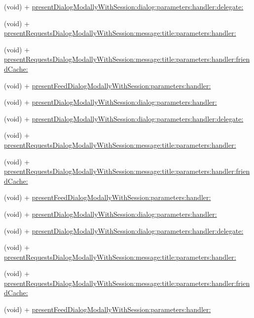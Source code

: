 \begin{DoxyCompactItemize}
(void) + \hyperlink{interfaceFBWebDialogs_a8be8194bef8e87199f915373776e122f}{present\+Dialog\+Modally\+With\+Session\+:dialog\+:parameters\+:handler\+:delegate\+:}
\item 
(void) + \hyperlink{interfaceFBWebDialogs_abea4b28e51126b41381c83cac5aa6a1c}{present\+Requests\+Dialog\+Modally\+With\+Session\+:message\+:title\+:parameters\+:handler\+:}
\item 
(void) + \hyperlink{interfaceFBWebDialogs_a50539709ca0985ee356cfa23b2eb2903}{present\+Requests\+Dialog\+Modally\+With\+Session\+:message\+:title\+:parameters\+:handler\+:friend\+Cache\+:}
\item 
(void) + \hyperlink{interfaceFBWebDialogs_a040eaa8259068aa3035ee5aa803a1271}{present\+Feed\+Dialog\+Modally\+With\+Session\+:parameters\+:handler\+:}
\item 
(void) + \hyperlink{interfaceFBWebDialogs_aa4d2e1b0b7a49ea3d08964a09a20ec63}{present\+Dialog\+Modally\+With\+Session\+:dialog\+:parameters\+:handler\+:}
\item 
(void) + \hyperlink{interfaceFBWebDialogs_a8be8194bef8e87199f915373776e122f}{present\+Dialog\+Modally\+With\+Session\+:dialog\+:parameters\+:handler\+:delegate\+:}
\item 
(void) + \hyperlink{interfaceFBWebDialogs_abea4b28e51126b41381c83cac5aa6a1c}{present\+Requests\+Dialog\+Modally\+With\+Session\+:message\+:title\+:parameters\+:handler\+:}
\item 
(void) + \hyperlink{interfaceFBWebDialogs_a50539709ca0985ee356cfa23b2eb2903}{present\+Requests\+Dialog\+Modally\+With\+Session\+:message\+:title\+:parameters\+:handler\+:friend\+Cache\+:}
\item 
(void) + \hyperlink{interfaceFBWebDialogs_a040eaa8259068aa3035ee5aa803a1271}{present\+Feed\+Dialog\+Modally\+With\+Session\+:parameters\+:handler\+:}
\item 
(void) + \hyperlink{interfaceFBWebDialogs_aa4d2e1b0b7a49ea3d08964a09a20ec63}{present\+Dialog\+Modally\+With\+Session\+:dialog\+:parameters\+:handler\+:}
\item 
(void) + \hyperlink{interfaceFBWebDialogs_a8be8194bef8e87199f915373776e122f}{present\+Dialog\+Modally\+With\+Session\+:dialog\+:parameters\+:handler\+:delegate\+:}
\item 
(void) + \hyperlink{interfaceFBWebDialogs_abea4b28e51126b41381c83cac5aa6a1c}{present\+Requests\+Dialog\+Modally\+With\+Session\+:message\+:title\+:parameters\+:handler\+:}
\item 
(void) + \hyperlink{interfaceFBWebDialogs_a50539709ca0985ee356cfa23b2eb2903}{present\+Requests\+Dialog\+Modally\+With\+Session\+:message\+:title\+:parameters\+:handler\+:friend\+Cache\+:}
\item 
(void) + \hyperlink{interfaceFBWebDialogs_a040eaa8259068aa3035ee5aa803a1271}{present\+Feed\+Dialog\+Modally\+With\+Session\+:parameters\+:handler\+:}
\end{DoxyCompactItemize}


